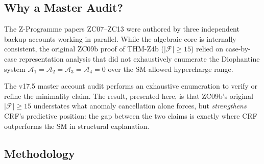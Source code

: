 \documentclass[12pt, a4paper]{article}
\begin{document}

\subsection{Why a Master Audit?}

The Z-Programme papers ZC07–ZC13 were authored by three independent
backup accounts working in parallel. While the algebraic core is
internally consistent, the original ZC09b proof of THM-Z4b
($|\mathcal{F}| \geq 15$) relied on case-by-case representation
analysis that did not exhaustively enumerate the Diophantine system
$\mathcal{A}_1 = \mathcal{A}_2 = \mathcal{A}_3 = \mathcal{A}_4 = 0$
over the SM-allowed hypercharge range.

The v17.5 master account audit performs an exhaustive enumeration
to verify or refine the minimality claim. The result, presented
here, is that ZC09b's original $|\mathcal{F}| \geq 15$ understates
what anomaly cancellation alone forces, but \emph{strengthens} CRF's
predictive position: the gap between the two claims is exactly
where CRF outperforms the SM in structural explanation.

\subsection{Methodology}
\end{document}
